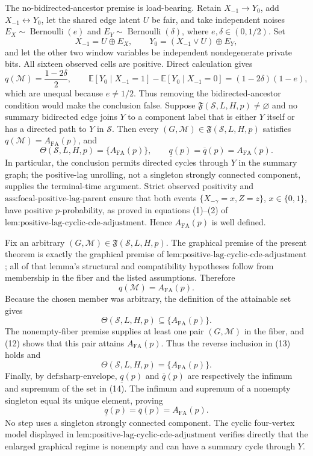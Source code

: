 The no-bidirected-ancestor premise is load-bearing. Retain \(X_{-1}\to Y_0\), add \(X_{-1}\leftrightarrow Y_0\), let the shared edge latent \(U\) be fair, and take independent noises \(E_X\sim\operatorname{Bernoulli}(e)\) and \(E_Y\sim\operatorname{Bernoulli}(\delta)\), where \(e,\delta\in(0,1/2)\). Set
\[
X_{-1}=U\mathbin{\oplus}E_X,
\qquad
Y_0=(X_{-1}\mathbin{\lor}U)\mathbin{\oplus}E_Y,
\tag{10}
\]
and let the other two window variables be independent nondegenerate private bits. All sixteen observed cells are positive. Direct calculation gives
\[
q(\mathcal M)=\frac{1-2\delta}{2},
\qquad
\mathbb E[Y_0\mid X_{-1}=1]-\mathbb E[Y_0\mid X_{-1}=0]
=(1-2\delta)(1-e),
\tag{11}
\]
which are unequal because \(e\ne1/2\). Thus removing the bidirected-ancestor condition would make the conclusion false.
Suppose \(\mathfrak F(\mathcal S,L,H,p)\ne\varnothing\) and no summary bidirected edge joins \(Y\) to a component label that is either \(Y\) itself or has a directed path to \(Y\) in \(\mathcal S\). Then every \((G,\mathcal M)\in\mathfrak F(\mathcal S,L,H,p)\) satisfies \(q(\mathcal M)=A_{\mathrm{FA}}(p)\), and
\[
\Theta(\mathcal S,L,H,p)=\{A_{\mathrm{FA}}(p)\},
\qquad
\underline q(p)=\overline q(p)=A_{\mathrm{FA}}(p).
\]
In particular, the conclusion permits directed cycles through \(Y\) in the summary graph; the positive-lag unrolling, not a singleton strongly connected component, supplies the terminal-time argument.
Strict observed positivity and \(\text{ass:focal-positive-lag-parent}\) ensure that both events \(\{X_{-\gamma}=x,Z=z\}\), \(x\in\{0,1\}\), have positive \(p\)-probability, as proved in equations (1)--(2) of \(\text{lem:positive-lag-cyclic-cde-adjustment}\). Hence \(A_{\mathrm{FA}}(p)\) is well defined.

Fix an arbitrary \((G,\mathcal M)\in\mathfrak F(\mathcal S,L,H,p)\). The graphical premise of the present theorem is exactly the graphical premise of \(\text{lem:positive-lag-cyclic-cde-adjustment}\); all of that lemma's structural and compatibility hypotheses follow from membership in the fiber and the listed assumptions. Therefore
\[
q(\mathcal M)=A_{\mathrm{FA}}(p).
\tag{12}
\]
Because the chosen member was arbitrary, the definition of the attainable set gives
\[
\Theta(\mathcal S,L,H,p)\subseteq\{A_{\mathrm{FA}}(p)\}.
\tag{13}
\]
The nonempty-fiber premise supplies at least one pair \((G,\mathcal M)\) in the fiber, and (12) shows that this pair attains \(A_{\mathrm{FA}}(p)\). Thus the reverse inclusion in (13) holds and
\[
\Theta(\mathcal S,L,H,p)=\{A_{\mathrm{FA}}(p)\}.
\tag{14}
\]
Finally, by \(\text{def:sharp-envelope}\), \(\underline q(p)\) and \(\overline q(p)\) are respectively the infimum and supremum of the set in (14). The infimum and supremum of a nonempty singleton equal its unique element, proving
\[
\underline q(p)=\overline q(p)=A_{\mathrm{FA}}(p).
\]
No step uses a singleton strongly connected component. The cyclic four-vertex model displayed in \(\text{lem:positive-lag-cyclic-cde-adjustment}\) verifies directly that the enlarged graphical regime is nonempty and can have a summary cycle through \(Y\).
